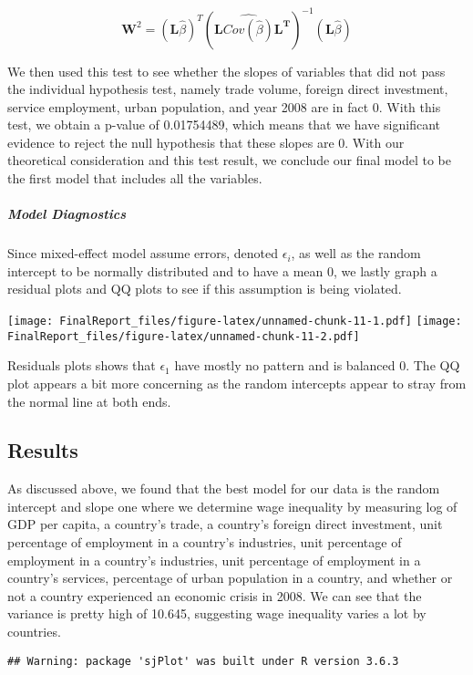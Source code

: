 \documentclass[
]{article}
\begin{document}
\[
\mathbf W^2 = (\mathbf L \hat\beta)^T(\mathbf L \hat{Cov(\hat\beta)}\mathbf L^{\mathbf T})^{-1}(\mathbf L \hat\beta)
\]

We then used this test to see whether the slopes of variables that did
not pass the individual hypothesis test, namely trade volume, foreign
direct investment, service employment, urban population, and year 2008
are in fact 0. With this test, we obtain a p-value of 0.01754489, which
means that we have significant evidence to reject the null hypothesis
that these slopes are 0. With our theoretical consideration and this
test result, we conclude our final model to be the first model that
includes all the variables.

\hypertarget{model-diagnostics}{%
\subparagraph{Model Diagnostics}\label{model-diagnostics}}

Since mixed-effect model assume errors, denoted \(\epsilon_i\), as well
as the random intercept to be normally distributed and to have a mean 0,
we lastly graph a residual plots and QQ plots to see if this assumption
is being violated.

\texttt{[image: FinalReport\_files/figure-latex/unnamed-chunk-11-1.pdf]}
\texttt{[image: FinalReport\_files/figure-latex/unnamed-chunk-11-2.pdf]}

Residuals plots shows that \(\epsilon_1\) have mostly no pattern and is
balanced 0. The QQ plot appears a bit more concerning as the random
intercepts appear to stray from the normal line at both ends.

\hypertarget{results}{%
\subsection{Results}\label{results}}

As discussed above, we found that the best model for our data is the
random intercept and slope one where we determine wage inequality by
measuring log of GDP per capita, a country's trade, a country's foreign
direct investment, unit percentage of employment in a country's
industries, unit percentage of employment in a country's industries,
unit percentage of employment in a country's services, percentage of
urban population in a country, and whether or not a country experienced
an economic crisis in 2008. We can see that the variance is pretty high
of 10.645, suggesting wage inequality varies a lot by countries.

\begin{verbatim}
## Warning: package 'sjPlot' was built under R version 3.6.3
\end{verbatim}
\end{document}
